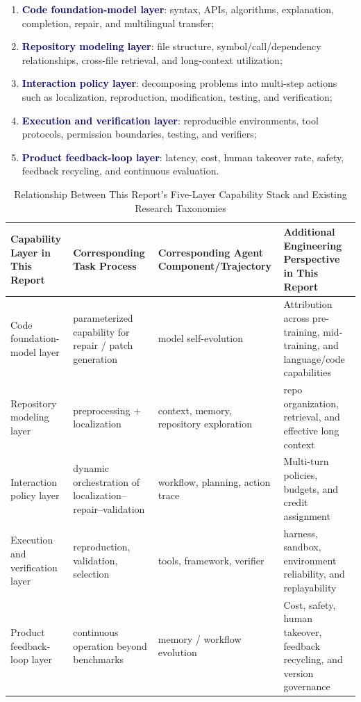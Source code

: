 \documentclass[10pt,a4paper,UTF8,fontset=none]{ctexart}
\newcommand{\stage}[1]{\textcolor{Navy}{\textbf{#1}}}
\begin{document}
\begin{enumerate}
  \item \stage{Code foundation-model layer}: syntax, APIs, algorithms, explanation, completion, repair, and multilingual transfer;
  \item \stage{Repository modeling layer}: file structure, symbol/call/dependency relationships, cross-file retrieval, and long-context utilization;
  \item \stage{Interaction policy layer}: decomposing problems into multi-step actions such as localization, reproduction, modification, testing, and verification;
  \item \stage{Execution and verification layer}: reproducible environments, tool protocols, permission boundaries, testing, and verifiers;
  \item \stage{Product feedback-loop layer}: latency, cost, human takeover rate, safety, feedback recycling, and continuous evaluation.
\end{enumerate}

\begin{table}[htbp]
\centering
\caption{Relationship Between This Report's Five-Layer Capability Stack and Existing Research Taxonomies}
\label{tab:taxonomy-map}
\small
\begin{tabularx}{\textwidth}{p{2.5cm}YYY}
\toprule
Capability Layer in This Report & Corresponding Task Process & Corresponding Agent Component/Trajectory & Additional Engineering Perspective in This Report \\
\midrule
Code foundation-model layer & parameterized capability for repair / patch generation & model self-evolution & Attribution across pre-training, mid-training, and language/code capabilities \\
Repository modeling layer & preprocessing + localization & context, memory, repository exploration & repo organization, retrieval, and effective long context \\
Interaction policy layer & dynamic orchestration of localization--repair--validation & workflow, planning, action trace & Multi-turn policies, budgets, and credit assignment \\
Execution and verification layer & reproduction, validation, selection & tools, framework, verifier & harness, sandbox, environment reliability, and replayability \\
Product feedback-loop layer & continuous operation beyond benchmarks & memory / workflow evolution & Cost, safety, human takeover, feedback recycling, and version governance \\
\bottomrule
\end{tabularx}
\end{table}
\end{document}
